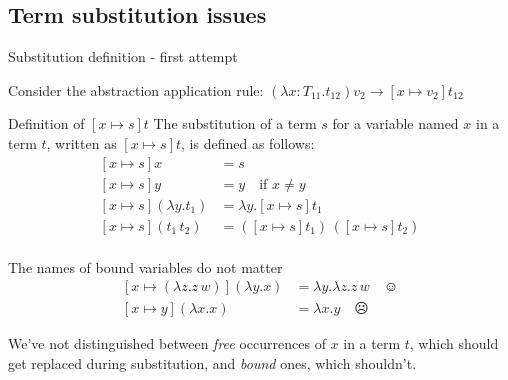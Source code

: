 \documentclass[8pt]{beamer}
\begin{document}
\subsection{Term substitution issues}

\begin{frame}{Substitution definition - first attempt}

    Consider the abstraction application rule:
        $(\lambda x:T_{11}.t_{12})v_{2} \rightarrow [x \mapsto v_{2}]t_{12}$

    \pause

    \begin{block}{Definition of $[x \mapsto s]t$}
        The substitution of a term $s$ for a variable named $x$ in a term $t$,
        written as $[x \mapsto s]t$, is defined as follows:
        \begin{displaymath}
            \begin{split}
                [x \mapsto s]x &= s \\
                [x \mapsto s]y &= y \quad \text{if } x \not = y\\
                [x \mapsto s](\lambda y.t_{1}) &= \lambda y. [x \mapsto s]t_{1} \\
                [x \mapsto s](t_{1} \, t_{2}) &= 
                    ([x \mapsto s]t_{1})\, ([x \mapsto s]t_{2})\\
            \end{split}
        \end{displaymath}        
    \end{block}

    \pause

    \begin{alertblock}{The names of bound variables do not matter}
        \begin{displaymath}
            \begin{split}
                [x \mapsto (\lambda z. z\, w)](\lambda y.x) &=
                     \lambda y.\lambda z.z\, w \quad \smiley \\
                [x \mapsto y](\lambda x.x) &= \lambda x.y \quad \frownie
            \end{split}
        \end{displaymath}
    \end{alertblock}
    \pause
    We've not distinguished between \emph{free} occurrences of $x$ in a term $t$,
    which should get replaced during substitution, and \emph{bound} ones, which
    shouldn't.
\end{frame}
\end{document}
